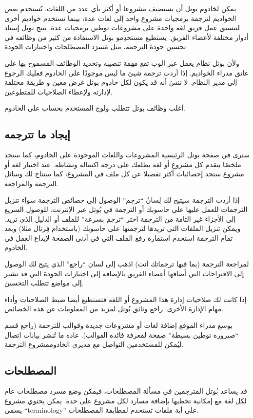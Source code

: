 يمكن لخادوم بوتل أن يستضيف مشروعا أو أكثر بأي عدد من اللغات. تُستخدم بعض
الخواديم لترجمة برمجيات مشروع واحد إلى لغات عدة، بينما تستخدم خواديم
أخرى لتنسيق عمل فريق لغة واحدة على مشروعات توطين برمجيات عدة. يتيح بوتل
إسناد أدوار مختلفة لأعضاء الفريق. يستطيع مستخدِمو بوتل الاستفادة من
كثير من وظائفه في تحسين جودة الترجمة، مثل مَسرَد المصطلحات واختبارات
الجودة.

ولأن بوتل نظام يعمل عبر الوب تقع مهمة تنصيبه وتحديد الوظائف المسموح بها
على عاتق مدراء الخواديم. إذا أردت ترجمة شيئ ما ليس موجودًا على الخادوم
فعليك الرجوع إلى مدير النظام. لا تنسَ أنه قد يكون لكل خادوم بوتل غرض
معين و طريقة مختلفة لإدارته ولإعطاء الصلاحيات للمتطوعين.

أغلب وظائف بوتل تتطلب ولوج المستخدم بحساب على الخادوم.

\subsection{إيجاد ما تترجمه}
سترى في صفحة بوتل الرئيسية المشروعات واللغات الموجودة على الخادوم، كما
ستجد ملخصًا بتقدم كل مشروع أو لغة يطلعك على درجة اكتماله ونشاطه. عند
اختيار لغة أو مشروع ستجد إحصائيات أكثر تفصيلا عن كل ملف في المشروع، كما
ستتاح لك وسائل الترجمة والمراجعة.

إذا أردت الترجمة سيتيح لك لِسانُ “ترجم” الوصول إلى خصائص الترجمة سواء
تنزيل الترجمات للعمل عليها على حاسوبك أو الترجمة في بُوتل عبر الإنترنت.
للوصول السريع إلى الأجزاء غير التامة من الترجمة اختر “ترجم بسرعة” للملف
أو الدليل الذي تريد. ويمكن تنزيل الملفات التي تريدها لترجمتها على
حاسوبك (باستخدام فِرتال مثلا) وبعد تمام الترجمة استخدم استمارة رفع
الملف التي في أدنى الصفحة لإيداع العمل في الخادوم.

لمراجعة الترجمة (بما فيها ترجماتك أنت) اذهب إلى لسان “راجع” الذي يتيح لك
الوصول إلى الاقتراحات التي أضافها أعضاء الفريق بالإضافة إلى اختبارات
الجودة التي قد تشير إلى مواضع تتطلب التحسين.

إذا كانت لك صلاحيات إدارة هذا المشروع أو اللغة فتستطيع أيضا ضبط
الصلاحيات وأداء مهام الإدارة الأخرى. راجع وثائق بُوتل لمزيد من
المعلومات عن هذه الخصائص.

بوسع مدراء الموقع إضافة لغات أو مشروعات جديدة وقوالب للترجمة (راجع قسم
“صيرورة توطين بسيطة” صفحة \at[ref:38565525] لمعرفة فائدة
القوالب). عادة ما تُنشر بيانات اتصال ليُمكن للمستخدمين التواصل مع مديري
الخادوم مشروع الترجمة.

\subsection[ref:20355427]{المصطلحات}
قد يساعد بُوتل المترجمين في مسألة
المصطلحات، فيمكن وضع مسرد مصطلحات عام لكل لغة مع إمكانية تخطيها بإضافة
مسارد لكل مشروع على حدة. يمكن يحتوي مشروع يسمى “terminology” على أية
ملفات تستخدم لمطابقة المصطلحات.

